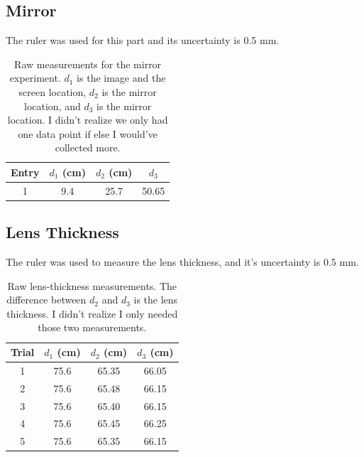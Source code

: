 \documentclass{article}
\begin{document}
\subsection{Mirror}
The ruler was used for this part and its uncertainty is 0.5 mm.

  \begin{table}[H]
    \centering
    \begin{tabular}{cccc}
        \hline
        Entry & $d_1$ (cm) & $d_2$ (cm) & $d_3$ \\
        \hline
        1 & 9.4 & 25.7 & 50.65 \\
        \hline
    \end{tabular}
    \caption{Raw measurements for the mirror experiment. 
    $d_1$ is the image and the screen location, 
    $d_2$ is the mirror location, and $d_3$ is the mirror location.
    I didn't realize we only had one data point if else I would've collected more.}
    \label{tab:mirror}
\end{table}  

\subsection{Lens Thickness}
The ruler was used to measure the lens thickness, and it's uncertainty is 0.5 mm.
\begin{table}[H]
    \centering
    \begin{tabular}{cccc}
        \hline
        Trial & $d_1$ (cm) & $d_2$ (cm) & $d_3$ (cm) \\
        \hline
        1 & 75.6 & 65.35 & 66.05 \\
        2 & 75.6 & 65.48 & 66.15 \\
        3 & 75.6 & 65.40 & 66.15 \\
        4 & 75.6 & 65.45 & 66.25 \\
        5 & 75.6 & 65.35 & 66.15 \\
        \hline
    \end{tabular}
    \caption{Raw lens-thickness measurements. 
    The difference between $d_2$ and $d_3$ is the lens thickness. 
    I didn't realize I only needed those two measurements.}
    \label{tab:lens_thickness}
\end{table}
\end{document}
